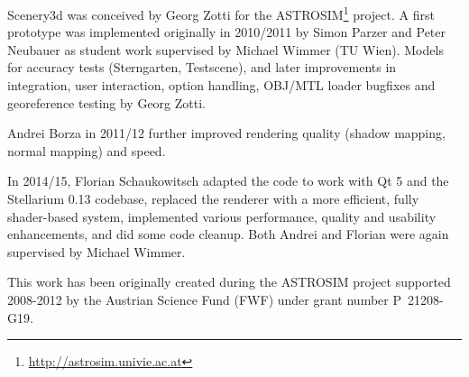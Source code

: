 Scenery3d was conceived by Georg Zotti for the
ASTROSIM\footnote{\url{http://astrosim.univie.ac.at}} project. A first
prototype was implemented originally in 2010/2011 by Simon Parzer and
Peter Neubauer as student work supervised by Michael Wimmer (TU Wien).
Models for accuracy tests (Sterngarten, Testscene), and later
improvements in integration, user interaction,  option handling,
OBJ/MTL loader bugfixes and georeference testing by Georg Zotti.

Andrei Borza in 2011/12 further improved
rendering quality (shadow mapping, normal mapping) and speed. 

In 2014/15,
Florian Schaukowitsch adapted the code to work with Qt 5 and the 
Stellarium 0.13 codebase, replaced the renderer with a more efficient, fully
shader-based system, implemented various performance, quality and usability
enhancements, and did some code cleanup. Both Andrei and Florian were again
supervised by Michael Wimmer.

This work has been originally created during the ASTROSIM project supported 2008-2012 by
the Austrian Science Fund (FWF) under grant number P~21208-G19.

%



